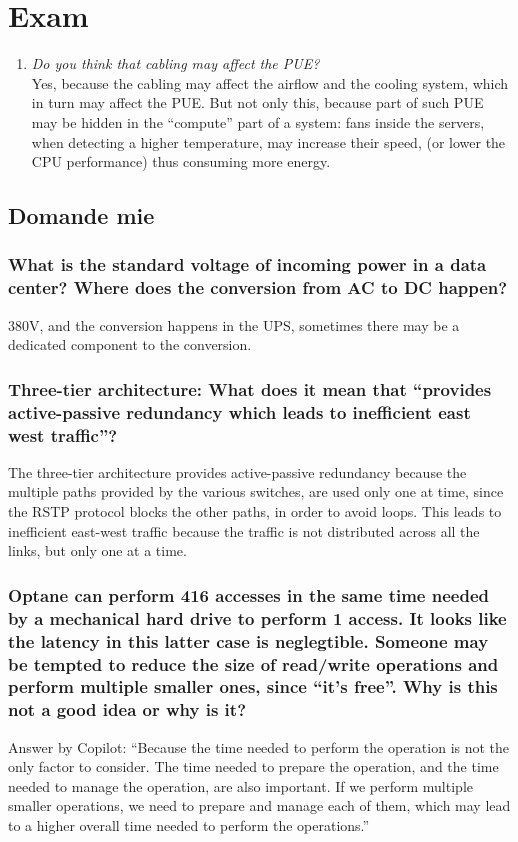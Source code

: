 \chapter{Exam}

\begin{enumerate}
   \item 
   \textit{Do you think that cabling may affect the PUE?}\\
   Yes, because the cabling may affect the airflow and the cooling system, which in turn may affect the PUE.
   But not only this, because part of such PUE may be hidden in the ``compute'' part of a system:
   fans inside the servers, when detecting a higher temperature, may increase their speed, (or lower the CPU performance) thus consuming more energy.
\end{enumerate}


\section{Domande mie}

\subsection{What is the standard voltage of incoming power in a data center? Where does the conversion from AC to DC happen?}
380V, and the conversion happens in the UPS, sometimes there may be a dedicated component to the conversion.

\subsection{Three-tier architecture: What does it mean that ``provides active-passive redundancy which leads to inefficient east west traffic''?}

The three-tier architecture provides active-passive redundancy because the multiple paths provided by the various switches, are used only one at time, since the RSTP protocol blocks the other paths, in order to avoid loops. This leads to inefficient east-west traffic because the traffic is not distributed across all the links, but only one at a time.
   

\subsection{Optane can perform 416 accesses in the same time needed by a mechanical hard drive to perform 1 access. It looks like the latency in this latter case is neglegtible. Someone may be tempted to reduce the size of read/write operations and perform multiple smaller ones, since ``it's free''. Why is this not a good idea or why is it?}

Answer by Copilot: ``Because the time needed to perform the operation is not the only factor to consider. The time needed to prepare the operation, and the time needed to manage the operation, are also important. If we perform multiple smaller operations, we need to prepare and manage each of them, which may lead to a higher overall time needed to perform the operations.''